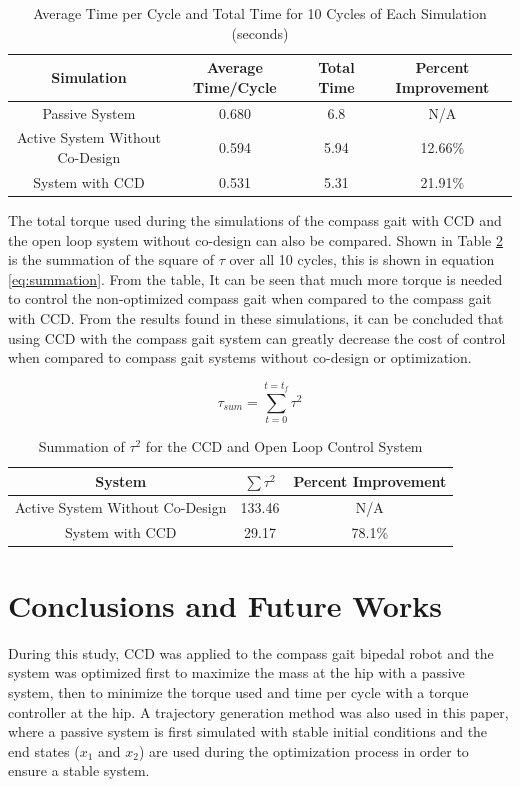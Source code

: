 \documentclass{./springer/svjour3}
\begin{document}
\begin{table}[h]
\centering
\caption{Average Time per Cycle and Total Time for 10 Cycles of Each Simulation (seconds)}
\begin{tabular}{cccc}
\toprule
Simulation & Average Time/Cycle & Total Time & Percent Improvement\\
\midrule
Passive System & 0.680 & 6.8 & N/A\\
Active System Without Co-Design & 0.594 & 5.94 & 12.66$\%$ \\
System with CCD & 0.531 & 5.31 & 21.91$\%$\\
\end{tabular}
\label{tab:time}
\end{table}

The total torque used during the simulations of the compass gait with CCD and the open loop system without co-design can also be compared. Shown in Table \ref{tab:tautot} is 
the summation of the square of $\tau$ over all 10 cycles, this is shown in equation \ref{eq:summation}. From the table, It can be seen that much more torque is needed to control 
the non-optimized 
compass gait when compared to the compass gait with CCD. From the results found in these simulations, it can be concluded that using CCD with the compass gait 
system can greatly decrease the cost of control when compared to compass gait systems without co-design or optimization.

\begin{equation}
\label{eq:summation}
\tau_{sum} = 
\sum_{t = 0}^{t = t_f}
\tau^2
\end{equation}

\begin{table}[h]
\centering
\caption{Summation of $\tau^2$ for the CCD and Open Loop Control System}
\begin{tabular}{ccc}
\toprule
System & $\sum \tau^2$ & Percent Improvement \\
\midrule
Active System Without Co-Design & 133.46 & N/A\\
System with CCD & 29.17 & 78.1$\%$\\
\end{tabular}
\label{tab:tautot}
\end{table}


\section{Conclusions and Future Works}

During this study, CCD was applied to the compass gait bipedal robot and the system was optimized first to maximize the mass at the hip with a passive system, 
then to minimize the torque used and time per cycle with a torque controller at the hip. A trajectory generation method was also used in this paper, 
where a passive system is first simulated with stable initial conditions and the end states ($x_1$ and $x_2$) are used during the optimization process in order to 
ensure a stable system.
\end{document}
